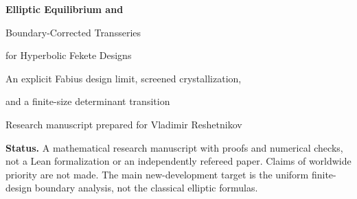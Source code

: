 \documentclass[11pt,a4paper]{article}
\theoremstyle{definition}
\theoremstyle{remark}
\newcommand{\sech}{\operatorname{sech}}
\begin{document}
\hypersetup{pageanchor=false}
\begin{titlepage}
\vspace*{12mm}
\vspace{16mm}
\begin{flushleft}
{\Huge\bfseries Elliptic Equilibrium and\par Boundary-Corrected Transseries\par for Hyperbolic Fekete Designs\par}
\vspace{9mm}
{\Large An explicit Fabius design limit, screened crystallization,\par and a finite-size determinant transition\par}
\vspace{11mm}
{\large Research manuscript prepared for Vladimir Reshetnikov}
\end{flushleft}
\vspace{12mm}
\begin{abstract}
The common-digit Fabius construction in the ProveIt repository leads to the
covariance kernel $\sech(u-v)$ and asks for the limiting distribution of
parameters maximizing its determinant on a fixed interval. We solve the
equilibrium-measure part of that question explicitly. The density is an
elliptic deformation of the arcsine law, its constant potential is a ratio
of complete elliptic integrals, and its large-interval expansion admits a
convergent exponential--logarithmic representation with a certified inverse.
These continuum results are connected with classical Green capacity rather
than presented as a new discovery of elliptic capacity.

The finite-design analysis goes further. We prove explicit two-sided energy
bounds, a dimension-independent bound on deviations from equal spacing when
the mean gap stays positive, and a dimension-uniform dilute boundary
correction. The latter quantifies the failure of the equally spaced design:
its energy exceeds the optimum by
$2(n-3)e^{-6h}/(n-1)+O(e^{-8h})$, with an absolute remainder uniform in the
number of nodes. It yields a deterministic transition
$\det R_n^*\to\exp(-4e^{-2s})$ at
$h=\tfrac12\log n+s$, together with three finite-size correction orders.
Exact $q$-product factorizations and a modular bulk expansion provide the
transseries connection. Full proofs, reproducible numerical diagnostics,
source provenance, and further research questions are included. Microscopic
fixed-interval endpoint spacings and a complete joint MacMahon asymptotic
are explicitly left open.
\end{abstract}
\vfill
\noindent\textbf{Status.} A mathematical research manuscript with proofs and numerical
checks, not a Lean formalization or an independently refereed paper. Claims
of worldwide priority are not made. The main new-development target is the
uniform finite-design boundary analysis, not the classical elliptic formulas.
\end{titlepage}
\hypersetup{pageanchor=true}
\end{document}
